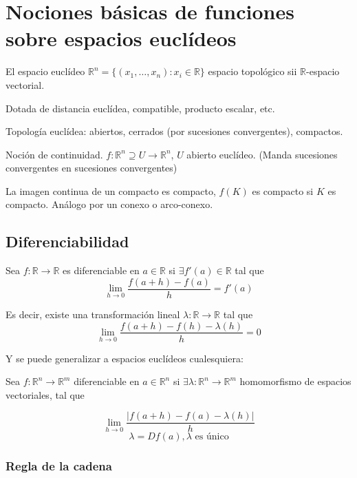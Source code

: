 \chapter{Nociones básicas de funciones sobre espacios euclídeos}

\begin{itemize*}
\item El espacio euclídeo $\mathbb{R}^n=\{(x_1,\dots,x_n):x_i\in \mathbb{R}\}$ espacio topológico sii $\mathbb{R}$-espacio vectorial.

\item Dotada de distancia euclídea, compatible, producto escalar, etc.

\item Topología euclídea: abiertos, cerrados (por sucesiones convergentes), compactos.

\item Noción de continuidad. $f:\mathbb{R}^n \supseteq U\rightarrow \mathbb{R}^n$, $U$ abierto euclídeo. (Manda sucesiones convergentes en sucesiones convergentes)

\item La imagen continua de un compacto es compacto, $f(K)$ es compacto si $K$ es compacto. Análogo por un conexo o arco-conexo. 
\end{itemize*}


\section{Diferenciabilidad}

Sea $f:\mathbb{R}\rightarrow \mathbb{R}$ es diferenciable en $a\in \mathbb{R}$ si $\exists f'(a)\in \mathbb{R}$ tal que 
$$\lim_{h\rightarrow 0} \frac{f(a+h)-f(a)}{h}=f'(a)$$

Es decir, existe una transformación lineal $\lambda:\mathbb{R}\rightarrow \mathbb{R}$ tal que
$$\lim_{h\rightarrow 0} \frac{f(a+h)-f(h)-\lambda(h)}{h}=0$$

Y se puede generalizar a espacios euclídeos cualesquiera:

Sea $f:\mathbb{R}^n\rightarrow \mathbb{R}^m$ diferenciable en $a\in \mathbb{R}^n$ si $\exists \lambda : \mathbb{R}^n\rightarrow \mathbb{R}^m$ homomorfismo de espacios vectoriales, tal que

$$\lim_{h\rightarrow 0} \frac{|f(a+h)-f(a)-\lambda(h)|}{h}$$
$$\lambda=Df(a), \lambda \text{ es único}$$


\subsection{Regla de la cadena}

